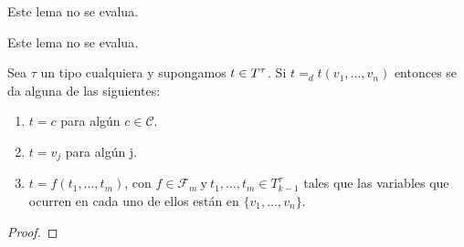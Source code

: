   \begin{lemma}
    \PN Este lema no se evalua.
  \end{lemma}

  \begin{lemma}
    \PN Este lema no se evalua.
  \end{lemma}

  \begin{lemma} \label{lemma_58}
    \PN Sea $\tau$ un tipo cualquiera y supongamos $t \in T^{\tau}$. Si $t =_{d} t(v_{1}, \dotsc, v_{n})$ entonces se da
    alguna de las siguientes:
    \begin{enumerate}
      \item $t = c$ para algún $c \in \mathcal{C}$.
      \item $t = v_{j}$ para algún j.
      \item $t = f(t_{1}, \dotsc, t_{m})$, con $f \in \mathcal{F}_{m} \ \text{y} \ t_{1}, \dotsc, t_{m} \in T_{k-1}^{\tau}$ tales
      que las variables que ocurren en cada uno de ellos están en $\{v_{1}, \dotsc, v_{n}\}$.
    \end{enumerate}
  \end{lemma}
  \begin{proof}
  \end{proof}

